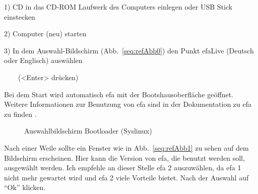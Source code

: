 \documentclass[a4paper,12pt,twoside]{article}
\newcounter{Abb}
\renewcommand\theAbb{\arabic{Abb}}
\begin{document}
1) CD in das CD-ROM Laufwerk des Computers einlegen oder USB Stick
einstecken

2) Computer (neu) starten

3) In dem Auswahl-Bildschirm (Abb.~\ref{seq:refAbb0}) den Punkt
{\textquotedbl}efaLive{\textquotedbl} (Deutsch oder Englisch) auswählen

\ \ \ \ ({\textless}Enter{\textgreater} drücken)


\bigskip

Bei dem Start wird automatisch efa mit der Bootshausoberfläche geöffnet.
Weitere Informationen zur Benutzung von efa sind in der Dokumentation
zu efa zu finden \cite{EFA2}.


\bigskip


\bigskip


\begin{figure}[htbp]
\centering
{}
\caption{Auswahlbildschirm Bootloader (Syslinux)}
\label{fig_syslinux}
\end{figure}

Nach einer Weile sollte ein Fenster wie in Abb.~\ref{seq:refAbb1} zu
sehen auf dem Bildschirm erscheinen. Hier kann die Version von efa, die
benutzt werden soll, ausgewählt werden. Ich empfehle an dieser Stelle
efa 2 auszuwählen, da efa 1 nicht mehr gewartet wird und efa 2 viele
Vorteile bietet. Nach der Auswahl auf "`Ok"' klicken.
\end{document}
